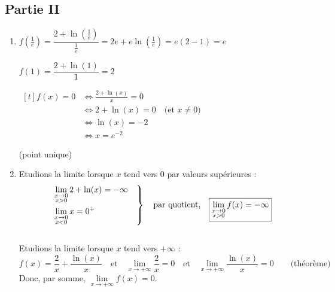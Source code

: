 \documentclass{scrartcl}
\begin{document}
\begin{adjustwidth}{2em}{0pt}
        \subsection*{Partie II}
        \begin{enumerate}
            \item	$f\left(\frac{1}{e}\right)=\dfrac{2+\ln\left(\frac{1}{e}\right)}{\frac{1}{e}}=2e+e\ln\left(\frac{1}{e}\right)=e(2-1)=e$ \qquad {} \par
                    $f(1)=\dfrac{2+\ln(1)}{1}=2$ \qquad {} \par
                    \vspace{1em}
                    $\begin{aligned}[t]
                        f(x)=0&\iff \frac{2+\ln(x)}{x}=0 \\
                        &\iff 2+\ln(x)=0\quad\text{(et $x\neq 0$)} \\
                        &\iff \ln(x)=-2 \\
                        &\iff x=e^{-2}
                    \end{aligned}$ \par\vspace{1em}
                     (point unique)
            \item   Etudions la limite lorsque $x$ tend vers $0$ par valeurs supérieures : \vspace{1em}
                    \[\begin{drcases}\lim\limits_{\substack{x\to 0\\x>0}}2+\ln(x)=-\infty\quad \\ \lim\limits_{\substack{x\to 0\\x<0}}x=0^+\end{drcases}\quad\text{par quotient,}\quad\boxed{\lim\limits_{\substack{x\to 0\\x>0}}f(x)=-\infty}\] \\ \vspace{1em}
                    Etudions la limite lorsque $x$ tend vers $+\infty$ :
                    \[f(x)=\frac{2}{x}+\frac{\ln(x)}{x}\quad\text{et}\quad\lim\limits_{x\to +\infty}\frac{2}{x}=0\quad\text{et}\quad\lim\limits_{x\to +\infty}\frac{\ln(x)}{x}=0\qquad\text{(théorème)}\] \vspace{1em}
                    Donc, par somme, $\lim\limits_{x\to +\infty}f(x)=0$.


\end{enumerate}
\end{adjustwidth}
\end{document}
